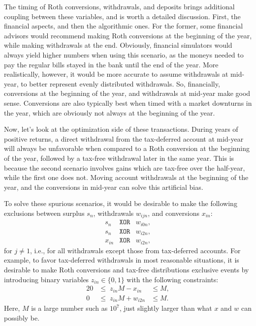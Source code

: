 \documentclass{report}[fleqn,12pt]
\begin{document}
	The timing of Roth conversions, withdrawals, and deposits brings
	additional coupling between these variables, and is worth a detailed discussion.
	First, the financial aspects, and then the algorithmic ones.
	For the former, some financial advisors would recommend making Roth
	conversions at the beginning of the year, while making withdrawals
	at the end. Obviously, financial simulators would always yield higher numbers
	when using this scenario, as the moneys needed to pay the regular bills 
	stayed in the bank until the end of the year. More realistically,
	however, it would be more accurate to assume withdrawals at mid-year,
	to better represent evenly distributed withdrawals. So, financially,
	conversions at the beginning of the year, and withdrawals at mid-year
	make good sense. Conversions are also typically best when
	timed with a market downturns in the year, which are obviously not always at the
	beginning of the year.

	Now, let's look at the optimization side of these transactions.
	During years of positive returns,
	a direct withdrawal from the tax-deferred account at mid-year will always
	be unfavorable when compared to a Roth conversion
	at the beginning of the year, followed
	by a tax-free withdrawal later in the same year.
	This is because the second
	scenario involves gains which are tax-free over the half-year, while
	the first one does not. Moving account withdrawals at the beginning
	of the year, and the conversions in mid-year can solve this artificial bias.

	To solve these spurious scenarios, it would be desirable to make the following exclusions
	between surplus $s_n$, withdrawals $w_{ijn}$, and conversions $x_{in}$:
	\begin{eqnarray*}
		s_n &\texttt{XOR} & w_{i0n}, \\
		s_n &\texttt{XOR} & w_{i2n}, \\
		x_{in} &\texttt{XOR} & w_{i2n},
	\end{eqnarray*}
	for $j \neq 1$, i.e., for all withdrawals except those from tax-deferred accounts.
	For example, to favor tax-deferred withdrawals in most reasonable situations,
	it is desirable to make Roth conversions and tax-free distributions exclusive events
	by introducing binary variables $z_{in} \in \{0, 1\}$ with the following constraints:
	\begin{alignat}{2}
		\label{Eq:Binary}
		0 & \le \; z_{in}M - x_{in} &\le M, \nonumber \\
		0 & \le \; z_{in}M + w_{i2n} &\le M.
	\end{alignat}
	Here, $M$ is a large number such as $10^7$, just slightly
	larger than what $x$ and $w$ can possibly be.
\end{document}

